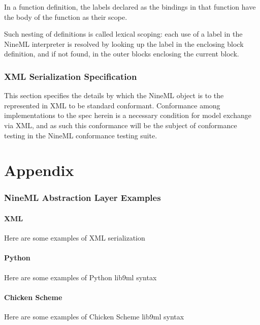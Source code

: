 \documentclass[a4paper]{article}
\begin{document}
In a function definition, the labels declared as the bindings in that
function have the body of the function as their scope.

Such nesting of definitions is called lexical scoping: each use of a
label in the NineML interpreter is resolved by looking up the label in
the enclosing block definition, and if not found, in the outer blocks
enclosing the current block.


\section{XML Serialization Specification}
This section specifies the details by which the NineML object is to
the represented in XML to be standard conformant.  Conformance among
implementations to the spec herein is a necessary condition for model
exchange via XML, and as such this conformance will be the subject of
conformance testing in the NineML conformance testing suite.
 


\newpage


\appendix


\part*{Appendix}

\section{\label{ap_examples}NineML Abstraction Layer Examples}

\subsection{XML}

Here are some examples of XML serialization


\subsection{Python}

Here are some examples of Python lib9ml syntax


\subsection{Chicken Scheme}

Here are some examples of Chicken Scheme lib9ml syntax



\end{document}
